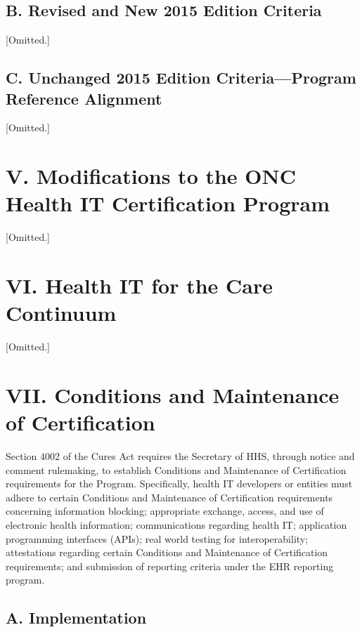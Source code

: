\documentclass[twoside,11pt]{article}
\begin{document}
          \subsection{B. Revised and New 2015 Edition Criteria}

[Omitted.]

          \subsection{C. Unchanged 2015 Edition Criteria—Program Reference Alignment}

[Omitted.]

          \section{V. Modifications to the ONC Health IT Certification Program}

[Omitted.]

          \section{VI. Health IT for the Care Continuum}

[Omitted.]

          \section{VII. Conditions and Maintenance of Certification}

          Section 4002 of the Cures Act requires the Secretary of HHS, through notice and comment rulemaking, to establish Conditions and Maintenance of Certification requirements for the Program. Specifically, health IT developers or entities must adhere to certain Conditions and Maintenance of Certification requirements concerning information blocking; appropriate exchange, access, and use of electronic health information; communications regarding health IT; application programming interfaces (APIs); real world testing for interoperability; attestations regarding certain Conditions and Maintenance of Certification requirements; and submission of reporting criteria under the EHR reporting program.


          \subsection{A. Implementation}
\end{document}
